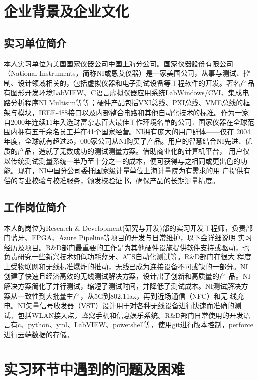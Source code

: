 \documentclass[UTF8]{ctexart}
\begin{document}
\section{企业背景及企业文化}
\subsection{实习单位简介}
本人实习单位为美国国家仪器公司中国上海分公司。国家仪器股份有限公司（National Instruments，简称NI或恩艾仪器）是一家美国公司，从事与测试、控
制、设计领域相关的，包括虚拟仪器和电子测试设备等工程软件的开发。著名产品有图形开发环境LabVIEW、C语言虚拟仪器应用系统LabWindows/CVI、集成电
路分析程序NI Multisim等等；硬件产品包括VXI总线、PXI总线、VME总线的框架与模块，IEEE-488接口以及内部整合电路和其他自动化技术的标准。作为一家
自2000年连续11年入选财富杂志百大最佳工作环境名单的公司，国家仪器在全球范围内拥有五千余名员工并在41个国家经营。NI拥有庞大的用户群体——仅在
2004年度，全球就有超过25，000家公司从NI购买了产品。用户的智慧结合NI先进、优质的产品，造就了无数成功的测试测量方案。借助商业化的计算机平台，
用户仅以传统测试测量系统一半乃至十分之一的成本，便可获得与之相同或更出色的功能。现在，NI中国分公司委托国家级计量单位上海计量院为有需求的用
户提供有偿的专业校验与校准服务，颁发校验证书，确保产品的长期测量精度。
\subsection{工作岗位简介}
本人的岗位为Research \& Development(研究与开发)部的实习开发工程师，负责部门蓝牙、FPGA、Azure Pipeline等项目的开发与日常维护，以下会详细说明
实习经历及项目。R\&D部门最重要的工作是为其他硬件设施提供软件支持或驱动，也负责研究一些新兴技术如低功耗蓝牙、ATS自动化测试等。R\&D部门在很大
程度上受物联网和无线标准爆炸的推动，无线已成为连接设备不可或缺的一部分。NI创建了快速且经济高效的无线测试解决方案，设计出了创新和高质量的产
品。NI解决方案简化了并行测试，缩短了测试时间，并降低了测试成本。NI测试解决方案从一致性到大批量生产，从5G到802.11ax，再到近场通信（NFC）和无
线充电。NI矢量信号收发器（VST）设计用于对各种无线设备进行快速而准确的测试，包括WLAN接入点，蜂窝手机和信息娱乐系统。R\&D部门日常使用的开发语
言有c、python、yml、LabVIEW、powershell等，使用git进行版本控制，perforce进行云端数据的存储。

\section{实习环节中遇到的问题及困难}
\end{document}
